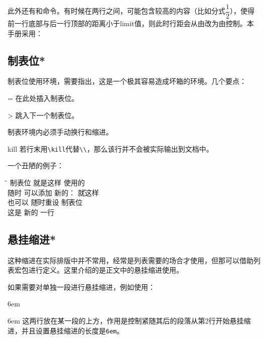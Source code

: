 此外还有和命令。有时候在两行之间，可能包含较高的内容（比如分式$\dfrac{1}{2}$），使得前一行底部与后一行顶部的距离小于limit值，则此时行距会从由改为由控制。本手册采用：
\begin{latex}
\setlength{\lineskiplimit}{3pt}
\setlength{\lineskip}{3pt}
\end{latex}

\subsection{制表位*}
制表位使用环境，需要指出，这是一个极其容易造成坏箱的环境。几个要点：
\begin{para}
\item[\char92{}=] 在此处插入制表位。
\item[\char92{}>] 跳入下一个制表位。
\item[\char92{}\char92{}] 制表环境内必须手动换行和缩进。
\item[\char92{}kill] 若行末用\verb|\kill|代替\verb|\\|，那么该行并不会被实际输出到文档中。
\end{para}

一个丑陋的例子：
\begin{codeshowabove}
\begin{tabbing}
\hspace{4em}\=\hspace{8em}\=\kill
制表位 \> 就是这样 \> 使用的 \\
随时 \> 可以添加 \> 新的： \= 就这样 \\
也可以 \= 随时重设 \= 制表位 \\
这是 \> 新的 \> 一行
\end{tabbing}
\end{codeshowabove}

\subsection{悬挂缩进*}
这种缩进在实际排版中并不常用，经常是列表需要的场合才使用，但那可以借助列表宏包进行定义。这里介绍的是正文中的悬挂缩进使用。

如果需要对单独一段进行悬挂缩进，例如使用：
\begin{latex}
\hangindent 6em
\end{latex}

\hangindent 6em
这两行放在某一段的上方，作用是控制紧随其后的段落从第2行开始悬挂缩进，并且设置悬挂缩进的长度是\texttt{6em}。

